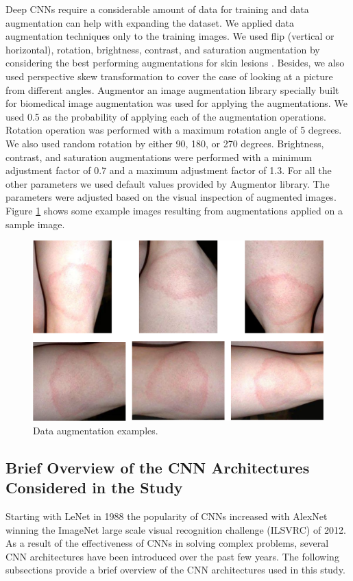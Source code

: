 Deep CNNs require a considerable amount of data for training and data augmentation can help with expanding the dataset. We applied data augmentation techniques only to the training images. We used flip (vertical or horizontal), rotation, brightness, contrast, and saturation augmentation by considering the best performing augmentations for skin lesions \cite{Perez2018}. Besides, we also used perspective skew transformation to cover the case of looking at a picture from different angles. Augmentor \cite{Bloice2019} an image augmentation library specially built for biomedical image augmentation was used for applying the augmentations. We used 0.5 as the probability of applying each of the augmentation operations. Rotation operation was performed with a maximum rotation angle of 5 degrees. We also used random rotation by either 90, 180, or 270 degrees. Brightness, contrast, and saturation augmentations were performed with a minimum adjustment factor of 0.7 and a maximum adjustment factor of 1.3. For all the other parameters we used default values provided by Augmentor library. The parameters were adjusted based on the visual inspection of augmented images. Figure \ref{fig:augmentation} shows some example images resulting from augmentations applied on a sample image.

\begin{figure}[htb!]
	\centering
	\includegraphics[width=\textwidth,keepaspectratio]{images/pretraining/Augmentation-cropped.pdf}
	\caption[Data augmentation examples]{Data augmentation examples.}
	\label{fig:augmentation}
\end{figure}

\subsection{Brief Overview of the CNN Architectures Considered in the Study}\label{sec:CNN-archis}
Starting with LeNet \cite{726791} in 1988 the popularity of CNNs increased with AlexNet \cite{Krizhevsky2017} winning the ImageNet large scale visual recognition challenge (ILSVRC) \cite{Russakovsky2015} of 2012. As a result of the effectiveness of CNNs in solving complex problems, several CNN architectures have been introduced over the past few years. The following subsections provide a brief overview of the CNN architectures used in this study.

